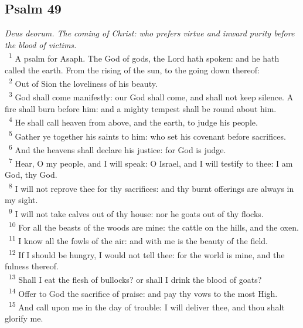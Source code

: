 \documentclass[a5paper,12pt]{article}
\begin{document}
\begin{multicols*}{2}
\section{Psalm 49}
\label{sec:orgc77e3ac}
\emph{Deus deorum. The coming of Christ: who prefers virtue and inward purity before the blood of victims.}\\

~\textsuperscript{1} A psalm for Asaph. The God of gods, the Lord hath spoken: and he hath called the earth. From the rising of the sun, to the going down thereof:\\
~\textsuperscript{2} Out of Sion the loveliness of his beauty.\\
~\textsuperscript{3} God shall come manifestly: our God shall come, and shall not keep silence. A fire shall burn before him: and a mighty tempest shall be round about him.\\
~\textsuperscript{4} He shall call heaven from above, and the earth, to judge his people.\\
~\textsuperscript{5} Gather ye together his saints to him: who set his covenant before sacrifices.\\
~\textsuperscript{6} And the heavens shall declare his justice: for God is judge.\\
~\textsuperscript{7} Hear, O my people, and I will speak: O Israel, and I will testify to thee: I am God, thy God.\\
~\textsuperscript{8} I will not reprove thee for thy sacrifices: and thy burnt offerings are always in my sight.\\
~\textsuperscript{9} I will not take calves out of thy house: nor he goats out of thy flocks.\\
~\textsuperscript{10} For all the beasts of the woods are mine: the cattle on the hills, and the oxen.\\
~\textsuperscript{11} I know all the fowls of the air: and with me is the beauty of the field.\\
~\textsuperscript{12} If I should be hungry, I would not tell thee: for the world is mine, and the fulness thereof.\\
~\textsuperscript{13} Shall I eat the flesh of bullocks? or shall I drink the blood of goats?\\
~\textsuperscript{14} Offer to God the sacrifice of praise: and pay thy vows to the most High.\\
~\textsuperscript{15} And call upon me in the day of trouble: I will deliver thee, and thou shalt glorify me.\\

\end{multicols*}
\end{document}
